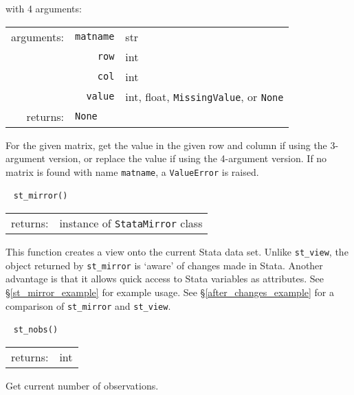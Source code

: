 \documentclass{article}
\begin{document}
			\vspace{1.5mm}
			\indent with 4 arguments:
			
			\indent \qquad \begin{tabular}{rrl}
					arguments: & \texttt{matname} & str \\
						& \texttt{row} & int \\
						& \texttt{col} & int \\
						& \texttt{value} & int, float, \lstinline$MissingValue$, or \texttt{None} \\
					returns: & \multicolumn{2}{l}{\texttt{None}}
				\end{tabular}
				
			\vspace{1.5mm}
			\noindent For the given matrix, get the value in the given row and column if using the 3-argument version, or replace the value if using the 4-argument version. If no matrix is found with name \lstinline{matname}, a \lstinline{ValueError} is raised. \newline
			
						
			\ \newline
			\noindent \lstinline$st_mirror()$
								
			\vspace{1.5mm}
			\noindent 
			\indent \begin{tabular}{rrl}
					returns: & \multicolumn{2}{l}{instance of \lstinline$StataMirror$ class}
				\end{tabular}
								
			\vspace{1.5mm}
			\noindent This function creates a view onto the current Stata data set. Unlike \lstinline{st_view}, the object returned by \lstinline{st_mirror} is `aware' of changes made in Stata. Another advantage is that it allows quick access to Stata variables as attributes. See \S\ref{st_mirror_example} for example usage. See \S\ref{after_changes_example} for a comparison of \lstinline{st_mirror} and \lstinline{st_view}. \newline
			
			
			\ \newline
			\noindent \lstinline$st_nobs()$
			
			\vspace{1.5mm}
			\noindent 
			\indent \begin{tabular}{rl}
					returns: & int
				\end{tabular}
								
			\vspace{1.5mm}
			\noindent Get current number of observations. \newline
			
\end{document}
